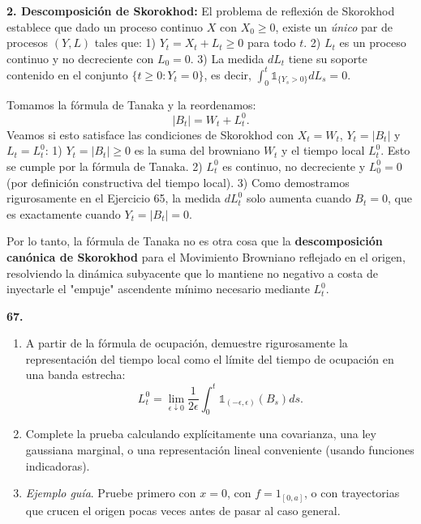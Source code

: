 \documentclass[11pt, letterpaper]{article}
\begin{document}
\begin{solucion}
    \textbf{2. Descomposición de Skorokhod:}
    El problema de reflexión de Skorokhod establece que dado un proceso continuo $X$ con $X_0 \ge 0$, existe un \textit{único} par de procesos $(Y, L)$ tales que:
    1) $Y_t = X_t + L_t \ge 0$ para todo $t$.
    2) $L_t$ es un proceso continuo y no decreciente con $L_0 = 0$.
    3) La medida $dL_t$ tiene su soporte contenido en el conjunto $\{t \ge 0 : Y_t = 0\}$, es decir, $\int_0^t \mathbb{1}_{\{Y_s > 0\}} dL_s = 0$.

    Tomamos la fórmula de Tanaka y la reordenamos:
    \[ |B_t| = W_t + L_t^0. \]
    Veamos si esto satisface las condiciones de Skorokhod con $X_t = W_t$, $Y_t = |B_t|$ y $L_t = L_t^0$:
    1) $Y_t = |B_t| \ge 0$ es la suma del browniano $W_t$ y el tiempo local $L_t^0$. Esto se cumple por la fórmula de Tanaka.
    2) $L_t^0$ es continuo, no decreciente y $L_0^0 = 0$ (por definición constructiva del tiempo local).
    3) Como demostramos rigurosamente en el Ejercicio 65, la medida $dL_t^0$ solo aumenta cuando $B_t = 0$, que es exactamente cuando $Y_t = |B_t| = 0$.

    Por lo tanto, la fórmula de Tanaka no es otra cosa que la \textbf{descomposición canónica de Skorokhod} para el Movimiento Browniano reflejado en el origen, resolviendo la dinámica subyacente que lo mantiene no negativo a costa de inyectarle el "empuje" ascendente mínimo necesario mediante $L_t^0$.
\end{solucion}

\newpage

\begin{ejercicio}
    \textbf{67.} 
    \begin{enumerate}
        \item A partir de la fórmula de ocupación, demuestre rigurosamente la representación del tiempo local como el límite del tiempo de ocupación en una banda estrecha:
        \[ L_{t}^{0} = \lim_{\epsilon \downarrow 0} \frac{1}{2\epsilon} \int_{0}^{t} \mathbb{1}_{(-\epsilon, \epsilon)}(B_{s}) ds. \]
        \item Complete la prueba calculando explícitamente una covarianza, una ley gaussiana marginal, o una representación lineal conveniente (usando funciones indicadoras).
        \item \textit{Ejemplo guía}. Pruebe primero con $x=0$, con $f=1_{[0,a]}$, o con trayectorias que crucen el origen pocas veces antes de pasar al caso general.
    \end{enumerate}
\end{ejercicio}
\end{document}
